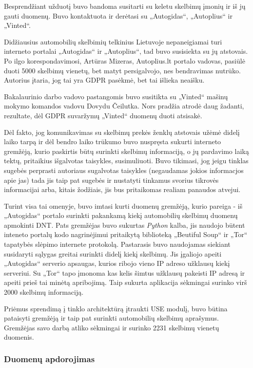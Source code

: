 \documentclass{VUMIFPSkursinis}
\begin{document}
Besprendžiant užduotį buvo bandoma susitarti su keletu skelbimų įmonių ir iš jų gauti duomenų. Buvo kontaktuota ir derėtasi su „Autogidas“, „Autoplius“ ir „Vinted“.

Didžiausius automobilių skelbimių telkinius Lietuvoje nepaneigiamai turi interneto portalai „Autogidas“ ir „Autoplius“, tad buvo susisiekta su jų atstovais. Po ilgo korespondavimosi, Artūras Mizeras, Autoplius.lt portalo vadovas, pasiūlė duoti 5000 skelbimų vienetų, bet matyt persigalvojo, nes bendravimas nutrūko. Autorius įtaria, jog tai yra GDPR pasėkmė, bet tai išlieka neaišku.

Bakalaurinio darbo vadovo pastangomis buvo susitikta su „Vinted“ mašinų mokymo komandos vadovu Dovydu Čeilutka. Nors pradžia atrodė daug žadanti, rezultate, dėl GDPR suvaržymų „Vinted“ duomenų duoti atsisakė.

Dėl fakto, jog komunikavimas su skelbimų prekės ženklų atstovais užėmė didelį laiko tarpą ir dėl bendro laiko trūkumo buvo nuspręsta sukurti interneto gremžėją, kurio paskirtis būtų surinkti skelbimų informaciją, o jų pardavimo laiką tektų, pritaikius išgalvotas taisykles, susimuliuoti. Buvo tikimasi, jog jeigu tinklas sugebės perprasti autoriaus sugalvotas taisykles (negaudamas jokios informacjos apie jas) tada jis taip pat sugebės ir nustatyti tinkamus svorius tikrovės informacijai arba, kitais žodžiais, jis bus pritaikomas realiam panaudos atvejui.

Turint visa tai omenyje, buvo imtasi kurti duomenų gremžėją, kurio pareiga - iš „Autogidas“ portalo surinkti pakankamą kiekį automobilių skelbimų duomenų apmokinti DNT. Pats gremžėjas buvo sukurtas \textit{Python} kalba, jis naudojo būtent inteneto portalų kodo nagrinėjimui pritaikytą biblioteką „Beutiful Soup“ ir „Tor“ tapatybės slėpimo internete protokolą. Pastarasis buvo naudojamas siekiant susidaryti sąlygas greitai surinkti didelį kiekį skelbimų. Jis įgaliojo apeiti „Autogidas“ serverio apsaugas, kurios ribojo vieno IP adreso užklausų kiekį serveriui. Su „Tor“ tapo įmonoma kas kelis šimtus užklausų pakeisti IP adresą ir apeiti prieš tai minėtą apribojimą. Taip sukurta aplikacija sėkmingai surinko virš 2000 skelbimų informaciją.    

Priėmus sprendimą į tinklo architektūrą įtraukti USE modulį, buvo būtina pataisyti gremžėją ir taip pat surinkti automobilių skelbimų aprašymus. Gremžėjas savo darbą atliko sėkmingai ir surinko 2231 skelbimų vienetų duomenis.

\subsubsection{Duomenų apdorojimas}
\end{document}
